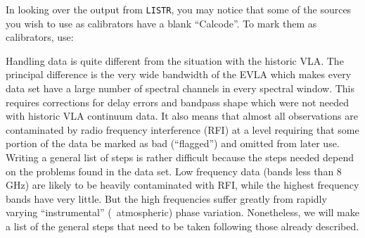      In looking over the output from {\tt LISTR}, you may notice that
some of the sources you wish to use as calibrators have a blank
``Calcode''.  To mark them as calibrators, use:


Handling  data is quite different from the situation with the
historic VLA\@.  The principal difference is the very wide bandwidth
of the EVLA which makes every data set have a large number of spectral
channels in every spectral window.  This requires corrections for
delay errors and bandpass shape which were not needed with historic
VLA continuum data.  It also means that almost all observations are
contaminated by radio frequency interference (RFI) at a level
requiring that some portion of the data be marked as bad
(``flagged'') and omitted from later use.  Writing a general list of
 steps is rather difficult because the steps needed
depend on the problems found in the data set.  Low frequency data
(bands less than 8 GHz) are likely to be heavily contaminated with
RFI, while the highest frequency bands have very little.  But the high
frequencies suffer greatly from rapidly varying ``instrumental'' (\ie\
atmospheric) phase variation.  Nonetheless, we will make a list of the
general steps that need to be taken following those already
described.

